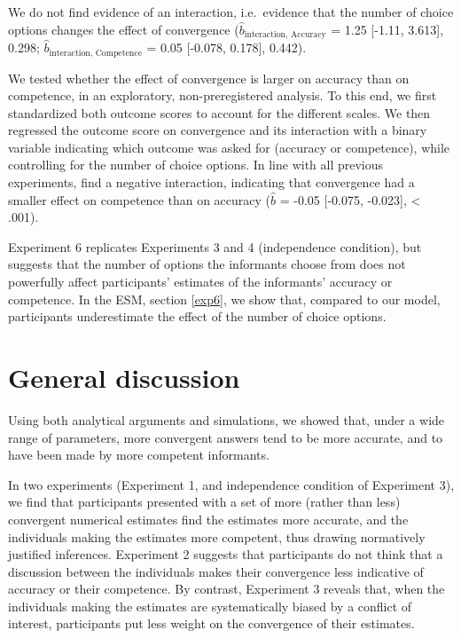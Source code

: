 \documentclass[
  doc,floatsintext]{apa6}
\begin{document}
We do not find evidence of an interaction, i.e.~evidence that the number of choice options changes the effect of convergence (\(\hat{b}_{\text{interaction, Accuracy}}\) = 1.25 {[}-1.11, 3.613{]}, 0.298; \(\hat{b}_{\text{interaction, Competence}}\) = 0.05 {[}-0.078, 0.178{]}, 0.442).

We tested whether the effect of convergence is larger on accuracy than on competence, in an exploratory, non-preregistered analysis. To this end, we first standardized both outcome scores to account for the different scales. We then regressed the outcome score on convergence and its interaction with a binary variable indicating which outcome was asked for (accuracy or competence), while controlling for the number of choice options. In line with all previous experiments, find a negative interaction, indicating that convergence had a smaller effect on competence than on accuracy (\(\hat{b}\) = -0.05 {[}-0.075, -0.023{]}, \textless{} .001).

Experiment 6 replicates Experiments 3 and 4 (independence condition), but suggests that the number of options the informants choose from does not powerfully affect participants' estimates of the informants' accuracy or competence. In the ESM, section \ref{exp6}, we show that, compared to our model, participants underestimate the effect of the number of choice options.

\section{General discussion}\label{general-discussion}

Using both analytical arguments and simulations, we showed that, under a wide range of parameters, more convergent answers tend to be more accurate, and to have been made by more competent informants.

In two experiments (Experiment 1, and independence condition of Experiment 3), we find that participants presented with a set of more (rather than less) convergent numerical estimates find the estimates more accurate, and the individuals making the estimates more competent, thus drawing normatively justified inferences. Experiment 2 suggests that participants do not think that a discussion between the individuals makes their convergence less indicative of accuracy or their competence. By contrast, Experiment 3 reveals that, when the individuals making the estimates are systematically biased by a conflict of interest, participants put less weight on the convergence of their estimates.
\end{document}
